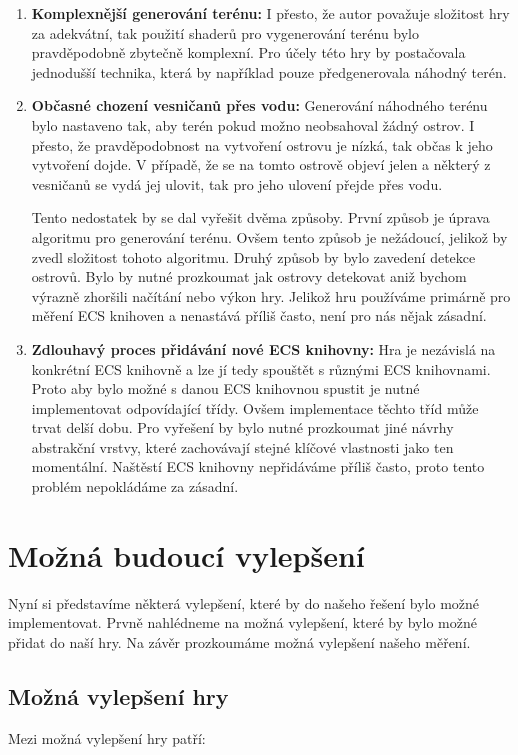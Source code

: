\begin{enumerate}
    \item \textbf{Komplexnější generování terénu:} I přesto, že autor považuje složitost hry za adekvátní, tak použití shaderů pro vygenerování terénu bylo pravděpodobně zbytečně komplexní. Pro účely této hry by postačovala jednodušší technika, která by například pouze předgenerovala náhodný terén.

    \item \textbf{Občasné chození vesničanů přes vodu:} Generování náhodného terénu bylo nastaveno tak, aby terén pokud možno neobsahoval žádný ostrov. I přesto, že pravděpodobnost na vytvoření ostrovu je nízká, tak občas k jeho vytvoření dojde. V případě, že se na tomto ostrově objeví jelen a některý z vesničanů se vydá jej ulovit, tak pro jeho ulovení přejde přes vodu.
    
    Tento nedostatek by se dal vyřešit dvěma způsoby. První způsob je úprava algoritmu pro generování terénu. Ovšem tento způsob je nežádoucí, jelikož by zvedl složitost tohoto algoritmu. Druhý způsob by bylo zavedení detekce ostrovů. Bylo by nutné prozkoumat jak ostrovy detekovat aniž bychom výrazně zhoršili načítání nebo výkon hry. Jelikož hru používáme primárně pro měření ECS knihoven a nenastává příliš často, není pro nás nějak zásadní.

    \item \textbf{Zdlouhavý proces přidávání nové ECS knihovny:} Hra je nezávislá na konkrétní ECS knihovně a lze jí tedy spouštět s různými ECS knihovnami. Proto aby bylo možné s danou ECS knihovnou spustit je nutné implementovat odpovídající třídy. Ovšem implementace těchto tříd může trvat delší dobu. Pro vyřešení by bylo nutné prozkoumat jiné návrhy abstrakční vrstvy, které zachovávají stejné klíčové vlastnosti jako ten momentální. Naštěstí ECS knihovny nepřidáváme příliš často, proto tento problém nepokládáme za zásadní.
\end{enumerate}

\section{Možná budoucí vylepšení}
Nyní si představíme některá vylepšení, které by do našeho řešení bylo možné implementovat. Prvně nahlédneme na možná vylepšení, které by bylo možné přidat do naší hry. Na závěr prozkoumáme možná vylepšení našeho měření.

\subsection{Možná vylepšení hry}
Mezi možná vylepšení hry patří:


